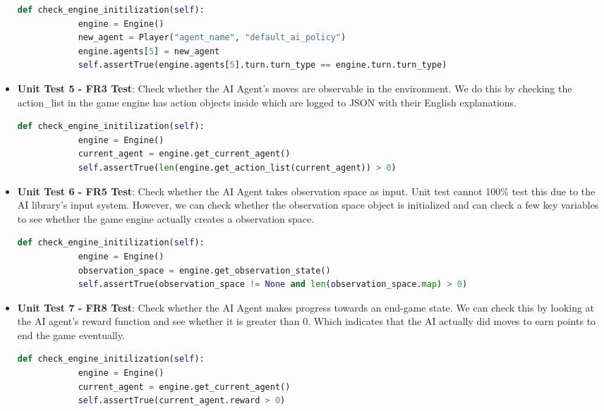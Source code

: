\documentclass[12pt, titlepage]{article}
\begin{document}
\begin{itemize}
    \begin{lstlisting}[language=Python]
        def check_engine_initilization(self):
            engine = Engine()
            new_agent = Player("agent_name", "default_ai_policy")
            engine.agents[5] = new_agent
            self.assertTrue(engine.agents[5].turn.turn_type == engine.turn.turn_type)
    \end{lstlisting}

    \item \textbf{Unit Test 5 - FR3 Test}: Check whether the AI Agent’s moves are observable in the environment. We do this by checking the action\_list in the game engine has action objects inside which are logged to JSON with their English explanations.
    
    \begin{lstlisting}[language=Python]
        def check_engine_initilization(self):
            engine = Engine()
            current_agent = engine.get_current_agent()
            self.assertTrue(len(engine.get_action_list(current_agent)) > 0)
    \end{lstlisting}

    \item \textbf{Unit Test 6 - FR5 Test}: Check whether the AI Agent takes observation space as input. Unit test cannot 100\% test this due to the AI library's input system. However, we can check whether the observation space object is initialized and can check a few key variables to see whether the game engine actually creates a observation space.
    
    \begin{lstlisting}[language=Python]
        def check_engine_initilization(self):
            engine = Engine()
            observation_space = engine.get_observation_state()
            self.assertTrue(observation_space != None and len(observation_space.map) > 0)
    \end{lstlisting}

    \item \textbf{Unit Test 7 - FR8 Test}: Check whether the AI Agent makes progress towards an end-game state. We can check this by looking at the AI agent's reward function and see whether it is greater than 0. Which indicates that the AI actually did moves to earn points to end the game eventually.
    
    \begin{lstlisting}[language=Python]
        def check_engine_initilization(self):
            engine = Engine()
            current_agent = engine.get_current_agent()
            self.assertTrue(current_agent.reward > 0)
    \end{lstlisting}


\end{itemize}
\end{document}
